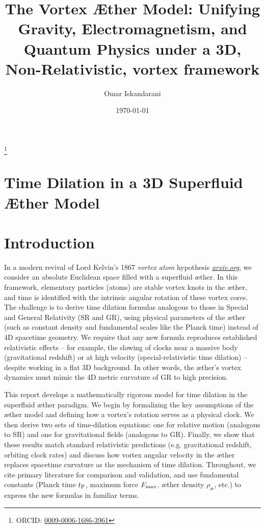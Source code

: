 \documentclass[aps,preprint,superscriptaddress]{revtex4}
\begin{document}
    \author{Omar Iskandarani}
    \title{The Vortex Æther Model: Unifying Gravity, Electromagnetism, and Quantum Physics under a 3D, Non-Relativistic, vortex framework}
    \date{\today}
    \thanks{ORCID: \href{https://orcid.org/0009-0006-1686-3961}{0009-0006-1686-3961}}




    \section*{Time Dilation in a 3D Superfluid Æther Model}

    \section*{Introduction}

    In a modern revival of Lord Kelvin’s 1867 \textit{vortex atom} hypothesis
    \href{https://arxiv.org/pdf/2012.07395#:~:text=Thomson%20,on%20the%20right%20path%20when}{\textit{arxiv.org}}, we consider an absolute Euclidean space filled with a superfluid æther. In this framework, elementary particles (atoms) are stable vortex knots in the æther, and time is identified with the intrinsic angular rotation of these vortex cores. The challenge is to derive time dilation formulas analogous to those in Special and General Relativity (SR and GR), using physical parameters of the æther (such as constant density and fundamental scales like the Planck time) instead of 4D spacetime geometry. We require that any new formula reproduces established relativistic effects – for example, the slowing of clocks near a massive body (gravitational redshift) or at high velocity (special-relativistic time dilation) – despite working in a flat 3D background. In other words, the æther’s vortex dynamics must mimic the 4D metric curvature of GR to high precision.

    This report develops a mathematically rigorous model for time dilation in the superfluid æther paradigm. We begin by formalizing the key assumptions of the æther model and defining how a vortex’s rotation serves as a physical clock. We then derive two sets of time-dilation equations: one for relative motion (analogous to SR) and one for gravitational fields (analogous to GR). Finally, we show that these results match standard relativistic predictions (e.g. gravitational redshift, orbiting clock rates) and discuss how vortex angular velocity in the æther replaces spacetime curvature as the mechanism of time dilation. Throughout, we cite primary literature for comparison and validation, and use fundamental constants (Planck time $t_{\textrm P}$, maximum force $F_{\textrm max}$, æther density $\rho_\text{\ae}$, etc.) to express the new formulas in familiar terms.
\end{document}
